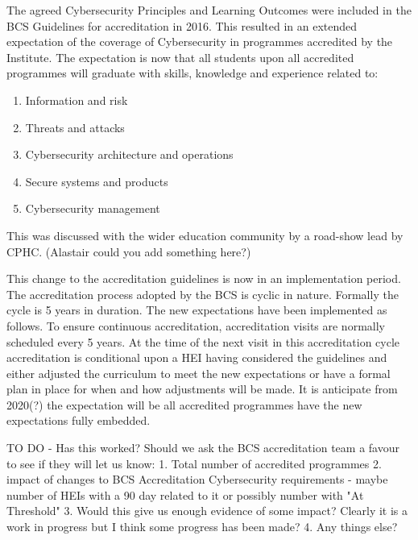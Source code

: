 \documentclass[sigconf]{acmart}
\begin{document}
The agreed Cybersecurity Principles and Learning Outcomes were included in the BCS Guidelines for accreditation in 2016. This resulted in an extended expectation of the coverage of Cybersecurity in programmes accredited by the Institute. The expectation is now that all students upon all accredited programmes will graduate with skills, knowledge and experience related to:
\begin{enumerate}
\item Information and risk
\item Threats and attacks
\item Cybersecurity architecture and operations
\item Secure systems and products
\item Cybersecurity management
\end{enumerate}
This was discussed with the wider education community by a road-show lead by CPHC. (Alastair could you add something here?)

This change to the accreditation guidelines is now in an implementation period. The accreditation process adopted by the BCS is cyclic in nature. Formally the cycle is 5 years in duration. The new expectations have been implemented as follows. To ensure continuous accreditation,  accreditation visits are normally scheduled every 5 years. At the time of the next visit in this accreditation cycle accreditation is conditional upon a HEI having considered the guidelines and either adjusted the curriculum to meet the new expectations or have a formal plan in place for when and how adjustments will be made.  It is anticipate from 2020(?) the expectation will be all accredited programmes have the new expectations fully embedded. 

TO DO - Has this worked? Should we ask the BCS accreditation team a favour to see if they will let us know: 
1. Total number of accredited programmes
2. impact of changes to  BCS Accreditation Cybersecurity requirements - maybe number of HEIs with a 90 day related to it or possibly number with "At Threshold"
3. Would this give us enough evidence of some impact? Clearly it is a work in progress but I think some progress has been made?
4. Any things else?





 
\end{document}
